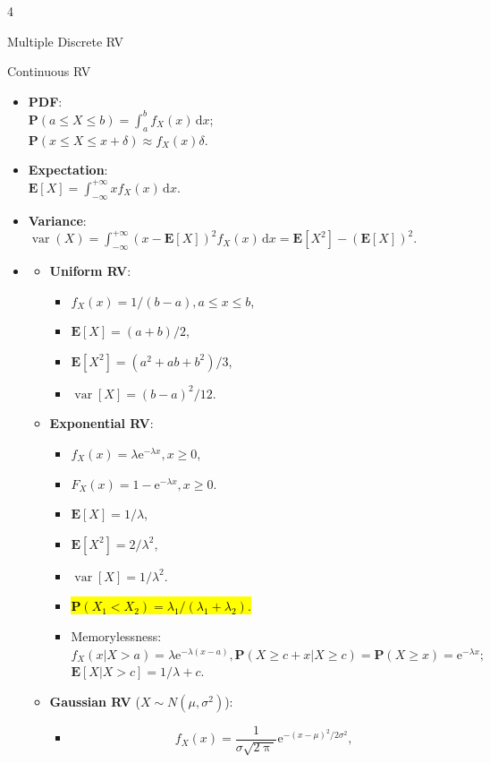 \documentclass[landscape,a4paper]{article}
\renewcommand{\emph}[1]{\hl{#1}}
\newcommand{\e}{\mathrm{e}}
\newcommand{\PP}{\mathbf{P}}
\newcommand{\EE}{\mathbf{E}}
\newcommand{\var}{\operatorname{var}}
\begin{document}
\begin{multicols*}{4}
\begin{card}{Multiple Discrete RV}
		\end{card}
		\begin{card}{Continuous RV}
			\begin{itemize}
				\item \textbf{PDF}:\\ $\PP(a\le X\le b)=\int_a^bf_X(x)\,\mathrm dx$;\\
				$\PP(x\le X\le x+\delta)\approx f_X(x)\delta$.
				\item \textbf{Expectation}:\\ $\EE[X]=\int_{-\infty}^{+\infty} xf_X(x)\,\mathrm dx$.
				\item \textbf{Variance}:\\ $\var(X)=\int_{-\infty}^{+\infty}\left(x-\EE[X]\right)^2f_X(x)\,\mathrm dx=\EE[X^2]-\left(\EE[X]\right)^2$.
				\item \begin{itemize}
					\item \textbf{Uniform RV}:
					\begin{itemize}
						\item $f_X(x)=1/(b-a),a\le x\le b$,
						\item $\EE[X]=(a+b)/2$,
						\item $\EE[X^2]=(a^2+ab+b^2)/3$,
						\item $\var[X]=(b-a)^2/12$.
					\end{itemize}
					\item \textbf{Exponential RV}:
					\begin{itemize}
						\item $f_X(x)=\lambda\e^{-\lambda x},x\ge 0$,
						\item $F_X(x)=1-\e^{-\lambda x},x\ge 0$.
						\item $\EE[X]=1/\lambda$,
						\item $\EE[X^2]=2/\lambda^2$,
						\item $\var[X]=1/\lambda^2$.
						\item \emph{$\PP(X_1<X_2)=\lambda_1/(\lambda_1+\lambda_2)$.}
						\item Memorylessness:\\
						$f_X(x|X>a)=\lambda \e^{-\lambda(x-a)}, \PP(X\ge c+x|X\ge c)=\PP(X\ge x)=\e^{-\lambda x};$\\$\EE[X|X>c]=1/\lambda+c$.
					\end{itemize}
					\item \textbf{Gaussian RV} ($X\sim N(\mu,\sigma^2)$):
					\begin{itemize}
						\item \[f_X(x)=\frac{1}{\sigma\sqrt{2\uppi}}\e^{-(x-\mu)^2/2\sigma^2},\]

\end{itemize}
\end{itemize}
\end{itemize}
\end{card}
\end{multicols*}
\end{document}
